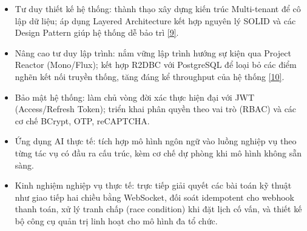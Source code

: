 \documentclass[12pt,a4paper]{article}
\begin{document}
\begin{itemize}
    \item Tư duy thiết kế hệ thống: thành thạo xây dựng kiến trúc Multi-tenant để cô lập dữ liệu; áp dụng Layered Architecture kết hợp nguyên lý SOLID và các Design Pattern giúp hệ thống dễ bảo trì \hyperref[ref:poeaa]{[9]}.
    \item Nâng cao tư duy lập trình: nắm vững lập trình hướng sự kiện qua Project Reactor (Mono/Flux); kết hợp R2DBC với PostgreSQL để loại bỏ các điểm nghẽn kết nối truyền thống, tăng đáng kể throughput của hệ thống \hyperref[ref:reactive]{[10]}.
    \item Bảo mật hệ thống: làm chủ vòng đời xác thực hiện đại với JWT (Access/Refresh Token); triển khai phân quyền theo vai trò (RBAC) và các cơ chế BCrypt, OTP, reCAPTCHA.
    \item Ứng dụng AI thực tế: tích hợp mô hình ngôn ngữ vào luồng nghiệp vụ theo từng tác vụ có đầu ra cấu trúc, kèm cơ chế dự phòng khi mô hình không sẵn sàng.
    \item Kinh nghiệm nghiệp vụ thực tế: trực tiếp giải quyết các bài toán kỹ thuật như giao tiếp hai chiều bằng WebSocket, đối soát idempotent cho webhook thanh toán, xử lý tranh chấp (race condition) khi đặt lịch cố vấn, và thiết kế bộ công cụ quản trị linh hoạt cho mô hình đa tổ chức.
\end{itemize}
\vspace{-8pt}

\end{document}
